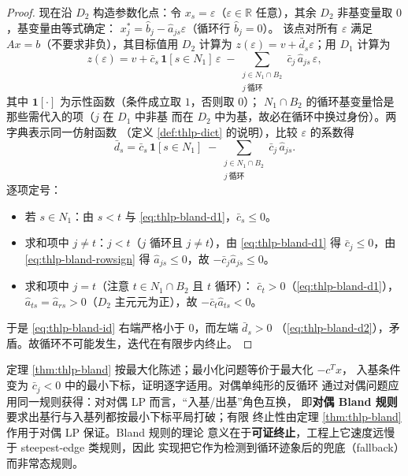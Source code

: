 \begin{proof}
现在沿 $D_2$ 构造参数化点：令 $x_s=\varepsilon$（$\varepsilon\in\mathbb{R}$
任意），其余 $D_2$ 非基变量取 $0$，基变量由等式确定：
$x_j^{*}=\hat b_j-\hat a_{js}\varepsilon$（循环行 $\hat b_j=0$）。
该点对所有 $\varepsilon$ 满足 $Ax=b$（不要求非负），其目标值用 $D_2$
计算为 $z(\varepsilon)=v+\bar d_s\varepsilon$；用 $D_1$ 计算为
\begin{equation*}
  z(\varepsilon)=v+\bar c_s\,\mathbf{1}[s\in N_1]\,\varepsilon
  \;-\!\!\sum_{\substack{j\in N_1\cap B_2\\ j\ \text{循环}}}\!\!
  \bar c_j\,\hat a_{js}\,\varepsilon ,
\end{equation*}
其中 $\mathbf{1}[\cdot]$ 为示性函数（条件成立取 $1$，否则取 $0$）；
$N_1\cap B_2$ 的循环基变量恰是那些需代入的项（$j$ 在 $D_1$ 中非基
而在 $D_2$ 中为基，故必在循环中换过身份）。两字典表示同一仿射函数
（定义 \ref{def:thlp-dict} 的说明），比较 $\varepsilon$ 的系数得
\begin{equation}\label{eq:thlp-bland-id}
  \bar d_s
  =\bar c_s\,\mathbf{1}[s\in N_1]
  \;-\!\!\sum_{\substack{j\in N_1\cap B_2\\ j\ \text{循环}}}
  \bar c_j\,\hat a_{js}.
\end{equation}
逐项定号：
\begin{itemize}
  \item 若 $s\in N_1$：由 $s<t$ 与 \eqref{eq:thlp-bland-d1}，$\bar c_s\le0$。
  \item 求和项中 $j\ne t$：$j<t$（$j$ 循环且 $j\ne t$），由
        \eqref{eq:thlp-bland-d1} 得 $\bar c_j\le0$，由
        \eqref{eq:thlp-bland-rowsign} 得 $\hat a_{js}\le0$，故
        $-\bar c_j\hat a_{js}\le0$。
  \item 求和项中 $j=t$（注意 $t\in N_1\cap B_2$ 且 $t$ 循环）：
        $\bar c_t>0$（\eqref{eq:thlp-bland-d1}），
        $\hat a_{ts}=\hat a_{rs}>0$（$D_2$ 主元元为正），故
        $-\bar c_t\hat a_{ts}<0$。
\end{itemize}
于是 \eqref{eq:thlp-bland-id} 右端严格小于 $0$，而左端 $\bar d_s>0$
（\eqref{eq:thlp-bland-d2}），矛盾。故循环不可能发生，迭代在有限步内终止。
\end{proof}

\begin{remark}\label{rem:thlp-bland-min-form}
定理 \ref{thm:thlp-bland} 按最大化陈述；最小化问题等价于最大化 $-c^{T}x$，
入基条件变为 $\bar c_j<0$ 中的最小下标，证明逐字适用。对偶单纯形的反循环
通过对偶问题应用同一规则获得：对对偶 LP 而言，``入基/出基''角色互换，
即\textbf{对偶 Bland 规则}要求出基行与入基列都按最小下标平局打破；有限
终止性由定理 \ref{thm:thlp-bland} 作用于对偶 LP 保证。Bland 规则的理论
意义在于\textbf{可证终止}，工程上它速度远慢于 steepest-edge 类规则，因此
实现把它作为检测到循环迹象后的兜底（fallback）而非常态规则。
\end{remark}

